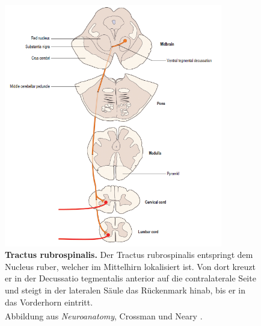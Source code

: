 \begin{figure}[H]
    \centering
    \includegraphics[width=0.85\textwidth]{pictures/Bilder_Laura/rubrospinal_tract.PNG}
    \caption[Tractus rubrospinalis]{\textbf{Tractus rubrospinalis.} Der Tractus rubrospinalis entspringt dem Nucleus ruber, welcher im Mittelhirn lokalisiert ist. Von dort kreuzt er in der Decussatio tegmentalis anterior auf die contralaterale Seite und steigt in der lateralen Säule das Rückenmark hinab, bis er in das Vorderhorn eintritt. \\
    Abbildung aus \textit{Neuroanatomy}, Crossman und Neary \textsuperscript{\cite[8]{crossman2014neuroanatomy}}.}
    \label{fig:tr_rubrospinalis}
\end{figure}

